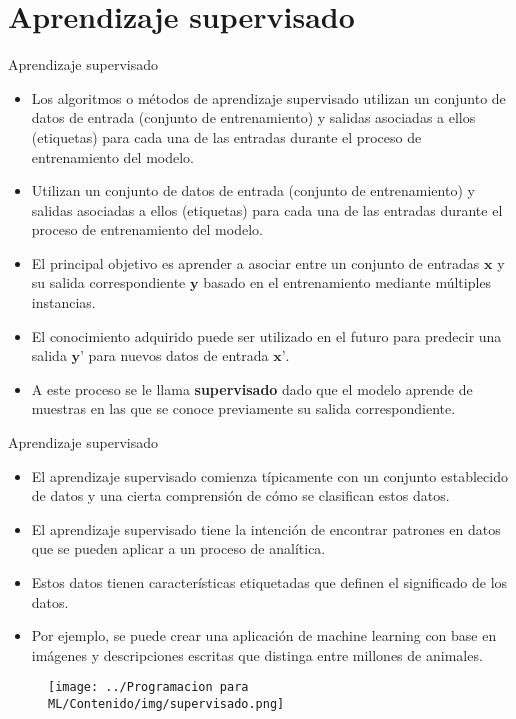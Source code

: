 \documentclass[11pt,aspectratio=169]{beamer}
\begin{document}
\section{Aprendizaje supervisado}
\begin{frame}{Aprendizaje supervisado}
\begin{itemize}
	\item Los algoritmos o métodos de aprendizaje supervisado utilizan un conjunto de datos de entrada (conjunto de entrenamiento) y salidas 
		asociadas a ellos (etiquetas) para cada una de las entradas durante el proceso de entrenamiento del modelo.\pause
	\item Utilizan un conjunto de datos de entrada (conjunto de entrenamiento) y salidas asociadas a ellos (etiquetas) para cada una de las 
		entradas durante el proceso de entrenamiento del modelo. \pause
	\item El principal objetivo es aprender a asociar entre un conjunto de entradas $\textbf{x}$ y su salida correspondiente $\textbf{y}$ 
		basado en el entrenamiento mediante múltiples instancias.\pause
	\item El conocimiento adquirido puede ser utilizado en el futuro para predecir una salida $\textbf{y'}$ para nuevos datos de entrada $\textbf{x'}$. \pause
	\item A este proceso se le llama \textbf{supervisado} dado que el modelo aprende de muestras en las que se conoce previamente su salida correspondiente.
\end{itemize}
\end{frame}

\begin{frame}{Aprendizaje supervisado}
\begin{itemize}
	\item El aprendizaje supervisado comienza típicamente con un conjunto establecido de datos y una cierta comprensión de cómo se clasifican estos datos. \pause
	\item El aprendizaje supervisado tiene la intención de encontrar patrones en datos que se pueden aplicar a un proceso de analítica.\pause
	\item Estos datos tienen características etiquetadas que definen el significado de los datos.\pause
	\item Por ejemplo, se puede crear una aplicación de machine learning con base en imágenes y descripciones escritas que distinga entre millones de animales.
\end{itemize}

\begin{figure}[H]
	\centering
	\texttt{[image: ../Programacion para ML/Contenido/img/supervisado.png]}
\end{figure}
\end{frame}
\end{document}
